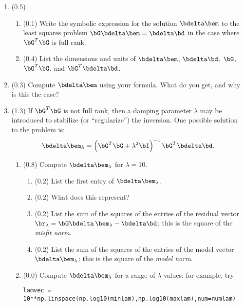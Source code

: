 \documentclass[11pt,titlepage,fleqn]{article}
\begin{document}
\begin{enumerate}
\item (0.5)
\begin{enumerate}
\item (0.1) Write the symbolic expression for the solution $\bdelta\bem$ to the least squares problem $\bG\bdelta\bem=\bdelta\bd$ in the case where $\bG^T\bG$ is full rank.

\item (0.4) List the dimensions and units of $\bdelta\bem$, $\bdelta\bd$, $\bG$, $\bG^T\bG$, and $\bG^T\bdelta\bd$.
\end{enumerate}


\item (0.3) Compute $\bdelta\bem$ using your formula.  What do you get, and why is this the case?


\item (1.3) If $\bG^T\bG$ is not full rank, then a damping parameter $\lambda$ may be introduced to stabilize (or ``regularize'') the inversion.  One possible solution to the problem is:
%
\begin{equation}
\bdelta\bem_{\lambda} = \left(\bG^T\bG+\lambda^2\bI\right)^{-1}\bG^T\bdelta\bd.
\end{equation}
%
\begin{enumerate}

\item (0.8) Compute $\bdelta\bem_{\lambda}$ for $\lambda = 10$.
%
\begin{enumerate}
\item (0.2) List the first entry of $\bdelta\bem_{\lambda}$.
\item (0.2) What does this represent?
\item (0.2) List the sum of the squares of the entries of the residual vector $\br_\lambda = \bG\bdelta\,\bem_\lambda-\bdelta\bd$; this is the square of the {\em misfit norm}.
\item (0.2) List the sum of the squares of the entries of the model vector $\bdelta\bem_{\lambda}$; this is the square of the {\em model norm}.
\end{enumerate}


\item (0.0) Compute $\bdelta\bem_{\lambda}$ for a range of $\lambda$ values: for example, try

\verb+lamvec = 10**np.linspace(np.log10(minlam),np.log10(maxlam),num=numlam)+


\end{enumerate}
\end{enumerate}
\end{document}
